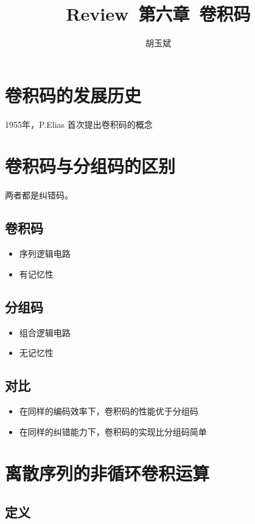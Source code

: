 \documentclass[onecolumn,oneside]{BUPTHomework}
\author{胡玉斌}
\title{Review\ 第六章\ 卷积码}
\begin{document}
  \maketitle
  
  \section*{卷积码的发展历史}

  1955年，P.Elias 首次提出卷积码的概念

  \section*{卷积码与分组码的区别}

  两者都是纠错码。

  \subsection*{卷积码}
  \begin{itemize}
    \item 序列逻辑电路
    \item 有记忆性
  \end{itemize}

  \subsection*{分组码}
  \begin{itemize}
    \item 组合逻辑电路
    \item 无记忆性
  \end{itemize}

  \subsection*{对比}

  \begin{itemize}
    \item 在同样的编码效率下，卷积码的性能优于分组码
    \item 在同样的纠错能力下，卷积码的实现比分组码简单
  \end{itemize}

  \section*{离散序列的非循环卷积运算}

  \subsection*{定义}
\end{document}
